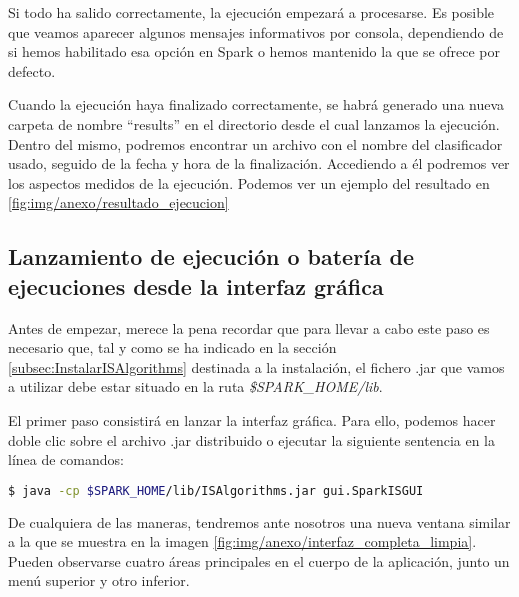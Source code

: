 Si todo ha salido correctamente, la ejecución empezará a procesarse. Es posible que veamos aparecer algunos mensajes informativos por consola, dependiendo de si hemos habilitado esa opción en Spark o hemos mantenido la que se ofrece por defecto.

Cuando la ejecución haya finalizado correctamente, se habrá generado una nueva carpeta de nombre ``results'' en el directorio desde el cual lanzamos la ejecución. Dentro del mismo, podremos encontrar un archivo con el nombre del clasificador usado, seguido de la fecha y hora de la finalización. Accediendo a él podremos ver los aspectos medidos de la ejecución. Podemos ver un ejemplo del resultado en \ref{fig:img/anexo/resultado_ejecucion}


\subsection{Lanzamiento de ejecución o batería de ejecuciones desde la interfaz gráfica}\label{subsec:ejecutaGUI}

Antes de empezar, merece la pena recordar que para llevar a cabo este paso es necesario que, tal y como se ha indicado en la sección \ref{subsec:InstalarISAlgorithms} destinada a la instalación, el fichero .jar que vamos a utilizar debe estar situado en la ruta \textit{\$SPARK\_HOME/lib}.

El primer paso consistirá en lanzar la interfaz gráfica. Para ello, podemos hacer doble clic sobre el archivo .jar distribuido o ejecutar la siguiente sentencia en la línea de comandos:

\begin{lstlisting}[language=bash]
$ java -cp $SPARK_HOME/lib/ISAlgorithms.jar gui.SparkISGUI
\end{lstlisting}

De cualquiera de las maneras, tendremos ante nosotros una nueva ventana similar a la que se muestra en la imagen \ref{fig:img/anexo/interfaz_completa_limpia}. Pueden observarse cuatro áreas principales en el cuerpo de la aplicación, junto un menú superior y otro inferior.


